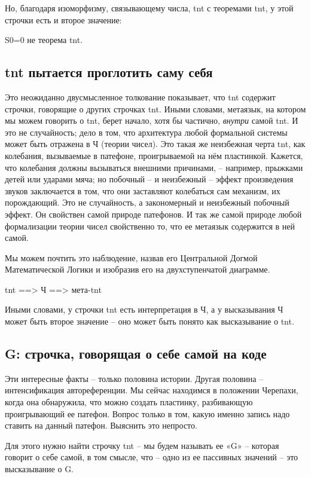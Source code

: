 \documentclass[../main.tex]{subfiles}
\begin{document}
Но, благодаря изоморфизму, связывающему числа, \acs{tnt} с теоремами \acs{tnt}, у этой строчки есть и второе значение:

S0=0 не теорема \acs{tnt}.


\subsection{\acs{tnt} пытается проглотить саму себя}

Это неожиданно двусмысленное толкование показывает, что \acs{tnt} содержит строчки, говорящие о других строчках \acs{tnt}\@. Иными словами, метаязык, на котором мы можем говорить о \acs{tnt}, берет начало, хотя бы частично, \emph{внутри} самой \acs{tnt}\@. И это не случайность; дело в том, что архитектура любой формальной системы может быть отражена в Ч (теории чисел). Это такая же неизбежная черта \acs{tnt}, как колебания, вызываемые в патефоне, проигрываемой на нём пластинкой. Кажется, что колебания должны вызываться внешними причинами, \--- например, прыжками детей или ударами мяча; но побочный \--- и неизбежный \--- эффект произведения звуков заключается в том, что они заставляют колебаться сам механизм, их порождающий. Это не случайность, а закономерный и неизбежный побочный эффект. Он свойствен самой природе патефонов. И так же самой природе любой формализации теории чисел свойственно то, что ее метаязык содержится в ней самой.

Мы можем почтить это наблюдение, назвав его Центральной Догмой Математической Логики и изобразив его на двухступенчатой диаграмме.

\acs{tnt} ==\textgreater{} Ч ==\textgreater{} мета-\acs{tnt}

Иными словами, у строчки \acs{tnt} есть интерпретация в Ч, а у высказывания Ч может быть второе значение \--- оно может быть понято как высказывание о \acs{tnt}.


\subsection{G: строчка, говорящая о себе самой на коде}

Эти интересные факты \--- только половина истории. Другая половина \--- интенсификация автореференции. Мы сейчас находимся в положении Черепахи, когда она обнаружила, что можно создать пластинку, разбивающую проигрывающий ее патефон. Вопрос только в том, какую именно запись надо ставить на данный патефон. Выяснить это непросто.

Для этого нужно найти строчку \acs{tnt} \--- мы будем называть ее «G» \--- которая говорит о себе самой, в том смысле, что \--- одно из ее пассивных значений \--- это высказывание о G.
\end{document}
